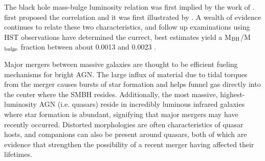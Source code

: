\documentclass[manuscript]{aastex}
\begin{document}




The black hole mass-bulge luminosity relation was first implied by the work of \cite{Dressler1988}. \cite{Dressler1989} first proposed the correlation and it was first illustrated by \cite{Kormendy1993}. 
A wealth of evidence continues to relate these two characteristics, and follow up examinations using HST observations have determined the currect, best estimates yield a M$_{\rm BH}$/M$_{\rm bulge}$ fraction between about 0.0013 and 0.0023 \citep{Merritt2001a,McLure2001,Marconi2003}. 

Major mergers between massive galaxies are thought to be efficient fueling mechanisms for bright AGN. The large influx of material due to tidal torques from the merger causes bursts of star formation and helps funnel gas directly into the center where the SMBH resides. \citep{Richards2006,Reddy2008,Hopkins2010} Additionally, the most massive, highest-luminosity AGN (i.e. quasars) reside in incredibly luminous infrared galaxies where star formation is abundant, signifying that major mergers may have recently occurred. \citep{Treister2012} Distorted morphologies are often characteristics of quasar hosts, and companions can also be present around quasars, both of which are evidence that strengthen the possibility of a recent merger having affected their lifetimes. 
\end{document}
